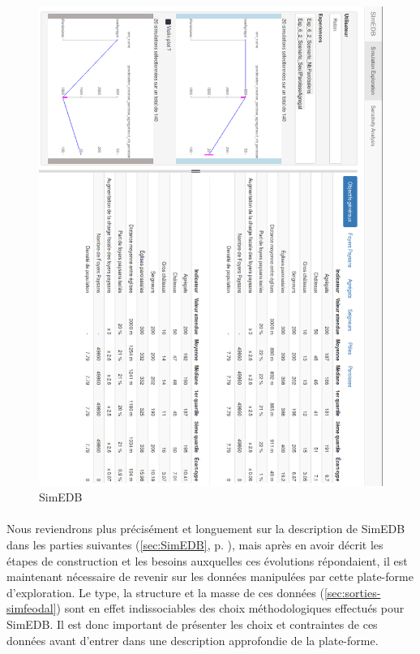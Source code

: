 \begin{figure}[H]
	\centering
	\includegraphics[width=\linewidth]{img/SimEDB_base_rotate.png}
	\caption{SimEDB }
	\label{fig:simedb_villages}
\end{figure}

\paragraph[Conclusion intermédiaire]{}
Nous reviendrons plus précisément et longuement sur la description de SimEDB dans les parties suivantes (\cref{sec:SimEDB}, p. \pageref{sec:SimEDB}), mais après en avoir décrit les étapes de construction et les besoins auxquelles ces évolutions répondaient, il est maintenant nécessaire de revenir sur les données manipulées par cette plate-forme d'exploration.
Le type, la structure et la masse de ces données (\cref{sec:sorties-simfeodal}) sont en effet indissociables des choix méthodologiques effectués pour SimEDB.
Il est donc important de présenter les choix et contraintes de ces données avant d'entrer dans une description approfondie de la plate-forme.

